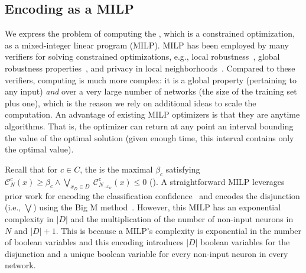 \subsection{Encoding \propa as a MILP}
\label{sec:overview_opt}
We express the problem of computing the \propa, which is a constrained optimization, as a mixed-integer linear program (MILP).    
MILP has been employed by many verifiers for solving constrained optimizations, e.g.,  %
local robustness~\cite{ref_86,ref_49,ref_42}, global robustness properties~\cite{ref_5,ref_6,ref_7}, and privacy in local neighborhoods~\cite{ref_8}.
Compared to these verifiers, computing \propa is much more complex: it is a global property (pertaining to any input) \emph{and} over a very large number of networks (the size of the training set plus one), which is the reason we rely on additional ideas to scale the computation.
An advantage of existing MILP optimizers is that they are anytime algorithms. That is, the optimizer can return at any point an interval bounding the value of the optimal solution (given enough time, this interval contains only the optimal value).

Recall that for $c\in C$, the \propa is the maximal $\beta_c$ satisfying $\mathcal{C}_{N}^c(x) \geq \beta_c \land \bigvee_{ x_D \in D}\ \mathcal{C}_{N_{-x_D}}^c(x) \leq 0$ (). 
 A straightforward MILP leverages prior work for encoding the classification confidence~\cite{ref_42} and
encodes the disjunction (i.e., $\bigvee$) %
using the Big M method~\cite{ref_73,ref_75}.
However, this MILP has an exponential complexity in $|D|$ and the multiplication of
the number of non-input neurons in $N$ and $|D|+1$. 
This is because a MILP's complexity is exponential in the number of boolean variables and this encoding introduces $|D|$ boolean variables for the disjunction and a unique boolean variable for every non-input neuron in every network.



